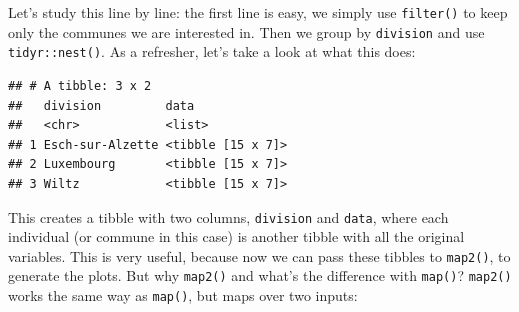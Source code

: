 \documentclass[]{gitbook}
\newenvironment{Shaded}{\begin{snugshade}}{\end{snugshade}}
\newcommand{\DataTypeTok}[1]{\textcolor[rgb]{0.13,0.29,0.53}{#1}}
\newcommand{\DecValTok}[1]{\textcolor[rgb]{0.00,0.00,0.81}{#1}}
\newcommand{\KeywordTok}[1]{\textcolor[rgb]{0.13,0.29,0.53}{\textbf{#1}}}
\newcommand{\NormalTok}[1]{#1}
\newcommand{\OperatorTok}[1]{\textcolor[rgb]{0.81,0.36,0.00}{\textbf{#1}}}
\newcommand{\StringTok}[1]{\textcolor[rgb]{0.31,0.60,0.02}{#1}}
\theoremstyle{definition}
\theoremstyle{definition}
\theoremstyle{definition}
\theoremstyle{remark}
\begin{document}
\begin{Shaded}
\end{Shaded}

Let's study this line by line: the first line is easy, we simply use
\texttt{filter()} to keep only the communes we are interested in. Then
we group by \texttt{division} and use \texttt{tidyr::nest()}. As a
refresher, let's take a look at what this does:

\begin{Shaded}
\end{Shaded}

\begin{verbatim}
## # A tibble: 3 x 2
##   division         data             
##   <chr>            <list>           
## 1 Esch-sur-Alzette <tibble [15 x 7]>
## 2 Luxembourg       <tibble [15 x 7]>
## 3 Wiltz            <tibble [15 x 7]>
\end{verbatim}

This creates a tibble with two columns, \texttt{division} and
\texttt{data}, where each individual (or commune in this case) is
another tibble with all the original variables. This is very useful,
because now we can pass these tibbles to \texttt{map2()}, to generate
the plots. But why \texttt{map2()} and what's the difference with
\texttt{map()}? \texttt{map2()} works the same way as \texttt{map()},
but maps over two inputs:
\end{document}
